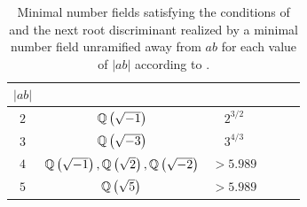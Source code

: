 \documentclass[../main.tex]{subfiles}
\begin{document}
\begin{table}
  \centering
  \begin{tabular}{ |Sc|Sc|Sc| } 
    \hline
    $\left| ab \right|$ 
    &
     & 
      \\
    \hline
    $2$ & $\mathbb{Q}\left( \sqrt{-1} \right)$ & $2^{3/2}$ \\ 
    $3$ & $\mathbb{Q}\left( \sqrt{-3} \right)$ & $3^{4/3}$\\ 
    $4$ & $\mathbb{Q}\left( \sqrt{-1} \right), \mathbb{Q}\left( \sqrt{2} \right), \mathbb{Q}\left( \sqrt{-2} \right)$ & $> 5.989$ \\
    $5$ & $\mathbb{Q}\left( \sqrt{5} \right)$ & $> 5.989$ \\ 
  \hline
  \end{tabular}
  \caption{Minimal number fields satisfying the conditions of  and the next root discriminant realized by a minimal number field unramified away from $ab$ for each value of $\left| ab \right|$ according to \cite{lmfdb}.}
  \label{table}
\end{table}
\end{document}
